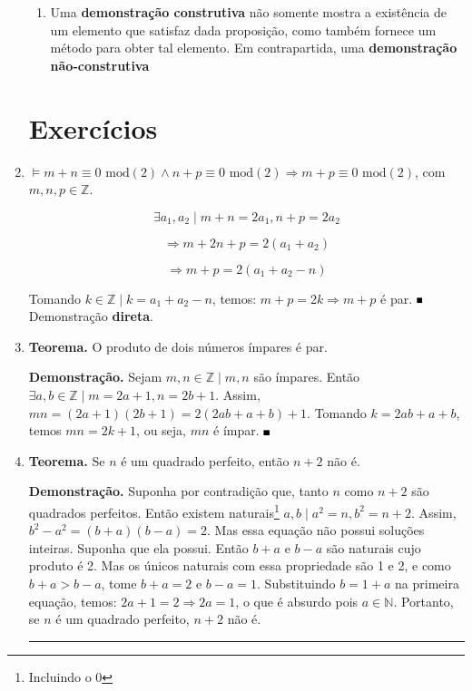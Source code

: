 \documentclass{article}
\newcommand{\qed}{\hfill\rule{1ex}{1ex}}
\begin{document}
\begin{enumerate}
\begin{enumerate}
            \item Uma \textbf{demonstração construtiva} não somente mostra a existência de um elemento que satisfaz dada proposição, como também fornece um método para obter tal elemento. Em contrapartida, uma \textbf{demonstração não-construtiva} 

        \end{enumerate}

        \section*{Exercícios}

    \item \( \models m + n \equiv 0 \textrm{ mod}(2)  \land n + p \equiv 0 \textrm{ mod}(2) \Rightarrow m + p \equiv 0 \textrm{ mod}(2)\), com \( m,n,p \in \mathbb{Z} \).

        \[ \exists a_1, a_2 \mid  m + n = 2a_1, n + p = 2a_2\]

        \[ \Rightarrow m + 2n + p = 2(a_1 + a_2) \] 

        \[ \Rightarrow m + p = 2(a_1 + a_2 - n) \] 

        Tomando \( k \in \mathbb{Z} \mid k = a_1 + a_2 - n\), temos: \( m + p = 2k \Rightarrow m + p \) é par. \( \qed \) Demonstração \textbf{direta}.

    \item \textbf{Teorema.} O produto de dois números ímpares é par.

        \textbf{Demonstração.} Sejam \( m, n \in \mathbb{Z} \mid m,n\) são ímpares. Então \( \exists a,b \in \mathbb{Z} \mid m = 2a+1, n = 2b+1 \). Assim, \( mn = (2a+1)(2b+1) = 2(2ab+a+b)+1 \). Tomando \( k = 2ab + a + b \), temos \( mn = 2k + 1 \), ou seja, \( mn \) é ímpar. \( \qed \)

    \item \textbf{Teorema.} Se \( n \) é um quadrado perfeito, então \( n + 2 \) não é.

        \textbf{Demonstração.} Suponha por contradição que, tanto \( n \) como \( n + 2 \) são quadrados perfeitos. Então existem naturais\footnote{Incluindo o 0} \( a,b \mid a^2 = n, b^2 = n + 2 \). Assim, \( b^2 - a^2 = (b+a)(b-a) = 2\). Mas essa equação não possui soluções inteiras. Suponha que ela possui. Então \( b+a \) e \( b - a \) são naturais cujo produto é 2. Mas os únicos naturais com essa propriedade são 1 e 2, e como \( b + a > b - a \), tome \( b + a = 2 \) e \( b - a = 1 \). Substituindo \( b = 1 + a \) na primeira equação, temos: \( 2a + 1 = 2 \Rightarrow 2a = 1\), o que é absurdo pois \( a \in \mathbb{N} \). Portanto, se \( n \) é um quadrado perfeito, \( n + 2 \) não é. \qed


\end{enumerate}
\end{document}
